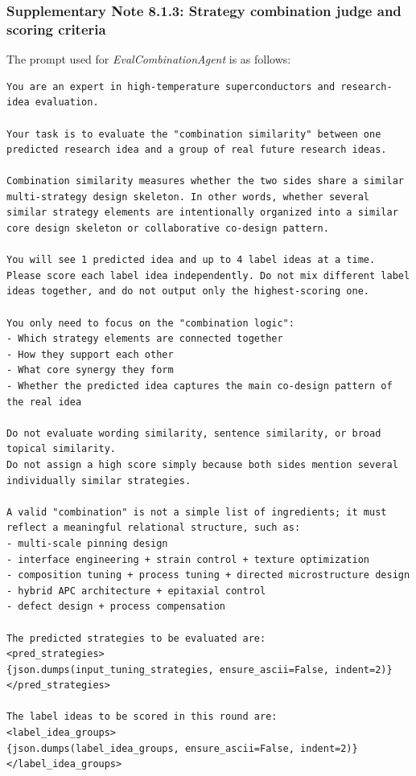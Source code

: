 \subsubsection*{Supplementary Note 8.1.3: Strategy combination judge and scoring criteria}
{}
The prompt used for \textit{EvalCombinationAgent} is as follows:
\begin{lstlisting}[style=jsonstyle]
You are an expert in high-temperature superconductors and research-idea evaluation.

Your task is to evaluate the "combination similarity" between one predicted research idea and a group of real future research ideas.

Combination similarity measures whether the two sides share a similar multi-strategy design skeleton. In other words, whether several similar strategy elements are intentionally organized into a similar core design skeleton or collaborative co-design pattern.

You will see 1 predicted idea and up to 4 label ideas at a time. Please score each label idea independently. Do not mix different label ideas together, and do not output only the highest-scoring one.

You only need to focus on the "combination logic":
- Which strategy elements are connected together
- How they support each other
- What core synergy they form
- Whether the predicted idea captures the main co-design pattern of the real idea

Do not evaluate wording similarity, sentence similarity, or broad topical similarity.
Do not assign a high score simply because both sides mention several individually similar strategies.

A valid "combination" is not a simple list of ingredients; it must reflect a meaningful relational structure, such as:
- multi-scale pinning design
- interface engineering + strain control + texture optimization
- composition tuning + process tuning + directed microstructure design
- hybrid APC architecture + epitaxial control
- defect design + process compensation

The predicted strategies to be evaluated are:
<pred_strategies>
{json.dumps(input_tuning_strategies, ensure_ascii=False, indent=2)}
</pred_strategies>

The label ideas to be scored in this round are:
<label_idea_groups>
{json.dumps(label_idea_groups, ensure_ascii=False, indent=2)}
</label_idea_groups>


\end{lstlisting}
